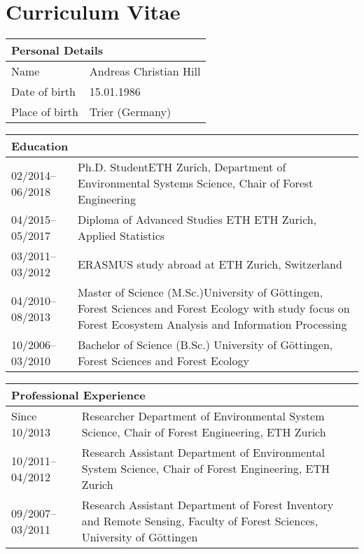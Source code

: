 \chapter*{Curriculum Vitae}
\label{chap:curriculum}
\renewcommand{\arraystretch}{1.5}
\pagestyle{plain}
\noindent
\begin{tabular*}{\textwidth}{p{}p{}}
\multicolumn{2}{l}{\large Personal Details}\\
\toprule
Name& Andreas Christian Hill\\
Date of birth& 15.01.1986\\
Place of birth&Trier (Germany)\\
\end{tabular*}

\noindent
\begin{tabular*}{\textwidth}{p{}p{}}
\multicolumn{2}{l}{\large Education}\\
\toprule
02/2014--06/2018& Ph.D. Student\newline ETH Zurich, Department of Environmental Systems Science, \newline Chair of Forest Engineering\\
04/2015--05/2017& Diploma of Advanced Studies ETH \newline ETH Zurich, Applied Statistics\\
03/2011--03/2012& ERASMUS study abroad at ETH Zurich, Switzerland \\
04/2010--08/2013&Master of Science (M.Sc.)\newline University of G{\"o}ttingen, Forest Sciences and Forest Ecology with study focus on Forest Ecosystem Analysis and Information Processing\\
10/2006--03/2010&Bachelor of Science (B.Sc.) \newline University of G{\"o}ttingen, Forest Sciences and Forest Ecology\\
\end{tabular*}


\noindent
\begin{tabular*}{\textwidth}{p{}p{}}
\multicolumn{2}{l}{\large Professional Experience}\\
\toprule
Since 10/2013&Researcher \newline Department of Environmental System Science, \newline Chair of Forest Engineering, ETH Zurich\\
10/2011--04/2012& Research Assistant \newline Department of Environmental System Science, \newline Chair of Forest Engineering, ETH Zurich \\
09/2007--03/2011& Research Assistant \newline Department of Forest Inventory and Remote Sensing, Faculty of Forest Sciences, University of G{\"o}ttingen
\end{tabular*}

